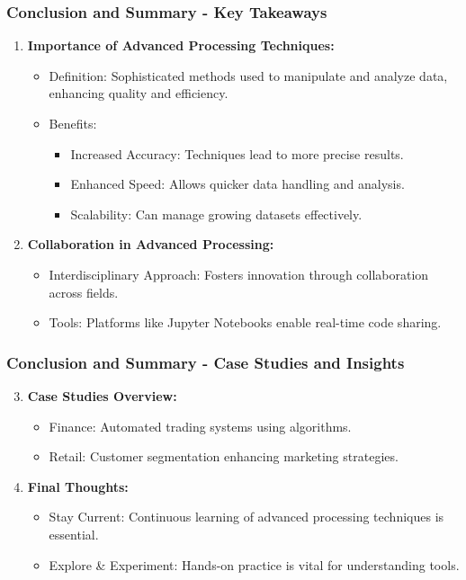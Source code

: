 \documentclass[aspectratio=169]{beamer}
\begin{document}
\begin{frame}[fragile]
    \frametitle{Conclusion and Summary - Key Takeaways}
    \begin{enumerate}
        \item \textbf{Importance of Advanced Processing Techniques:}
        \begin{itemize}
            \item Definition: Sophisticated methods used to manipulate and analyze data, enhancing quality and efficiency.
            \item Benefits:
            \begin{itemize}
                \item Increased Accuracy: Techniques lead to more precise results.
                \item Enhanced Speed: Allows quicker data handling and analysis.
                \item Scalability: Can manage growing datasets effectively.
            \end{itemize}
        \end{itemize}
        
        \item \textbf{Collaboration in Advanced Processing:}
        \begin{itemize}
            \item Interdisciplinary Approach: Fosters innovation through collaboration across fields.
            \item Tools: Platforms like Jupyter Notebooks enable real-time code sharing.
        \end{itemize}
    \end{enumerate}
\end{frame}

\begin{frame}[fragile]
    \frametitle{Conclusion and Summary - Case Studies and Insights}
    \begin{enumerate}
        \setcounter{enumi}{2}
        \item \textbf{Case Studies Overview:}
        \begin{itemize}
            \item Finance: Automated trading systems using algorithms.
            \item Retail: Customer segmentation enhancing marketing strategies.
        \end{itemize}
        
        \item \textbf{Final Thoughts:}
        \begin{itemize}
            \item Stay Current: Continuous learning of advanced processing techniques is essential.
            \item Explore \& Experiment: Hands-on practice is vital for understanding tools.
        \end{itemize}
    \end{enumerate}
\end{frame}
\end{document}
